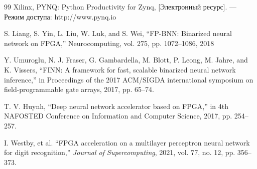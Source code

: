 \begin{thebibliography}{99}
     Xilinx, PYNQ: Python Productivity for Zynq, [Электронный ресурс]. — Режим доступа: http://www.pynq.io

     S. Liang, S. Yin, L. Liu, W. Luk, and S. Wei, “FP-BNN: Binarized
    neural network on FPGA,” Neurocomputing, vol. 275, pp. 1072–1086,
    2018
    
     Y. Umuroglu, N. J. Fraser, G. Gambardella, M. Blott, P. Leong, M. Jahre,
    and K. Vissers, “FINN: A framework for fast, scalable binarized
    neural network inference,” in Proceedings of the 2017 ACM/SIGDA
    international symposium on field-programmable gate arrays, 2017, pp.
    65–74.
    
     T. V. Huynh, “Deep neural network accelerator based on FPGA,” in 4th NAFOSTED Conference on Information and Computer Science, 2017, pp. 254--257.
    
     I. Westby, et al. “FPGA acceleration on a multilayer perceptron neural network for digit recognition,” \textit{Journal of Supercomputing}, 2021, vol. 77, no. 12, pp. 356--373.
    
\end{thebibliography}

